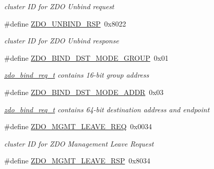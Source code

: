 \begin{DoxyCompactItemize}
\begin{DoxyCompactList}\small\item\em cluster I\-D for Z\-D\-O Unbind request \end{DoxyCompactList}\item 
\hypertarget{group__zdo_ga410489839f223dc8197a9bb7a8da071c}{\#define \hyperlink{group__zdo_ga410489839f223dc8197a9bb7a8da071c}{Z\-D\-O\-\_\-\-U\-N\-B\-I\-N\-D\-\_\-\-R\-S\-P}~0x8022}\label{group__zdo_ga410489839f223dc8197a9bb7a8da071c}

\begin{DoxyCompactList}\small\item\em cluster I\-D for Z\-D\-O Unbind response \end{DoxyCompactList}\item 
\hypertarget{group__zdo_gabde8d0c9053c0b4e5c2f747870ae79c5}{\#define \hyperlink{group__zdo_gabde8d0c9053c0b4e5c2f747870ae79c5}{Z\-D\-O\-\_\-\-B\-I\-N\-D\-\_\-\-D\-S\-T\-\_\-\-M\-O\-D\-E\-\_\-\-G\-R\-O\-U\-P}~0x01}\label{group__zdo_gabde8d0c9053c0b4e5c2f747870ae79c5}

\begin{DoxyCompactList}\small\item\em \hyperlink{unionzdo__bind__req__t}{zdo\-\_\-bind\-\_\-req\-\_\-t} contains 16-\/bit group address \end{DoxyCompactList}\item 
\hypertarget{group__zdo_gafdcf940776d593e2847a990248efc41a}{\#define \hyperlink{group__zdo_gafdcf940776d593e2847a990248efc41a}{Z\-D\-O\-\_\-\-B\-I\-N\-D\-\_\-\-D\-S\-T\-\_\-\-M\-O\-D\-E\-\_\-\-A\-D\-D\-R}~0x03}\label{group__zdo_gafdcf940776d593e2847a990248efc41a}

\begin{DoxyCompactList}\small\item\em \hyperlink{unionzdo__bind__req__t}{zdo\-\_\-bind\-\_\-req\-\_\-t} contains 64-\/bit destination address and endpoint \end{DoxyCompactList}\item 
\hypertarget{group__zdo_ga4fc084156021285ac010e1bb3a2bc5b8}{\#define \hyperlink{group__zdo_ga4fc084156021285ac010e1bb3a2bc5b8}{Z\-D\-O\-\_\-\-M\-G\-M\-T\-\_\-\-L\-E\-A\-V\-E\-\_\-\-R\-E\-Q}~0x0034}\label{group__zdo_ga4fc084156021285ac010e1bb3a2bc5b8}

\begin{DoxyCompactList}\small\item\em cluster I\-D for Z\-D\-O Management Leave Request \end{DoxyCompactList}\item 
\hypertarget{group__zdo_gadf2abd7ea7b2d93d334b8349595ada0e}{\#define \hyperlink{group__zdo_gadf2abd7ea7b2d93d334b8349595ada0e}{Z\-D\-O\-\_\-\-M\-G\-M\-T\-\_\-\-L\-E\-A\-V\-E\-\_\-\-R\-S\-P}~0x8034}\label{group__zdo_gadf2abd7ea7b2d93d334b8349595ada0e}


\end{DoxyCompactItemize}
